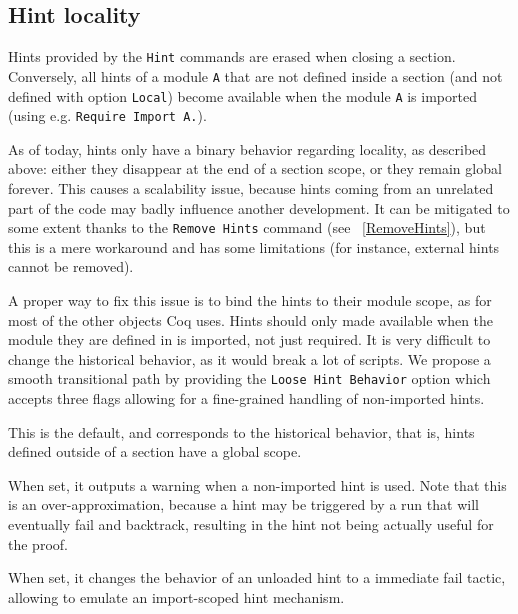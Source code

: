 \subsection{Hint locality
\label{Hint-Locality}}

Hints provided by the \texttt{Hint} commands are erased when closing a
section. Conversely, all hints of a module \texttt{A} that are not
defined inside a section (and not defined with option {\tt Local}) become
available when the module {\tt A} is imported (using
e.g. \texttt{Require Import A.}).

As of today, hints only have a binary behavior regarding locality, as described
above: either they disappear at the end of a section scope, or they remain
global forever. This causes a scalability issue, because hints coming from an
unrelated part of the code may badly influence another development. It can be
mitigated to some extent thanks to the {\tt Remove Hints} command
(see ~\ref{RemoveHints}), but this is a mere workaround and has some
limitations (for instance, external hints cannot be removed).

A proper way to fix this issue is to bind the hints to their module scope, as
for most of the other objects Coq uses. Hints should only made available when
the module they are defined in is imported, not just required. It is very
difficult to change the historical behavior, as it would break a lot of scripts.
We propose a smooth transitional path by providing the {\tt Loose Hint Behavior}
option which accepts three flags allowing for a fine-grained handling of
non-imported hints.

\begin{Variants}

\item {}

  This is the default, and corresponds to the historical behavior, that is,
  hints defined outside of a section have a global scope.

\item {}

  When set, it outputs a warning when a non-imported hint is used. Note that
  this is an over-approximation, because a hint may be triggered by a run that
  will eventually fail and backtrack, resulting in the hint not being actually
  useful for the proof.

\item {}

  When set, it changes the behavior of an unloaded hint to a immediate fail
  tactic, allowing to emulate an import-scoped hint mechanism.

\end{Variants}

